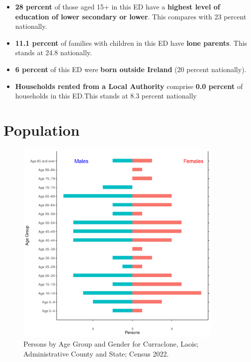 \documentclass{article}
\begin{document}
\begin{itemize}
\item \textbf{28 percent} of those aged 15+ in this ED have a \textbf{highest level of education of lower secondary or lower}. This compares with 23 percent nationally. 

\item \textbf{11.1 percent} of families with children in this ED have \textbf{lone parents}. This stands at 24.8 nationally.

\item \textbf{6 percent} of this ED were \textbf{born outside Ireland} (20 percent nationally).

\item \textbf{Households rented from a Local Authority} comprise \textbf{0.0 percent} of households in this ED.This stands at 8.3 percent nationally

\end{itemize}

\pagebreak

\section{Population} 
\label{sect:Pop}

\begin{figure}[h]
	\centering
	\includegraphics[width = 100mm]{../figures/PyramidPlot.pdf}
	\caption{Persons by Age Group and Gender for Curraclone, Laois; Administrative County and State; Census 2022.}
	\label{fig:2ae19629-1a6a-13a3-e055-000000000001}
	\end{figure}
\end{document}
